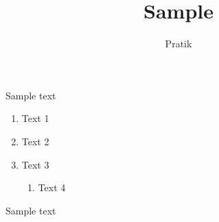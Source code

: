 \documentclass[12pt]{article}
\begin{document}
\title{Sample}
\author{Pratik}\maketitle

Sample text

\begin{enumerate}
\item Text 1
\item Text 2
\item Text 3
\begin{enumerate}
\item Text 4
\end{enumerate}
\end{enumerate}

Sample text
\end{document}
